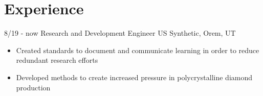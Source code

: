 \documentclass[]{friggeri-cv}
\begin{document}
\section{Experience}
\vspace{-3mm}
\begin{entrylist}

  \entry
    {8/19 - now}
    {Research and Development Engineer}
    {US Synthetic, Orem, UT}
    {\vspace{-4mm}
    \begin{itemize}
        \item Created standards to document and communicate learning in order to reduce redundant research efforts
        \item Developed methods to create increased pressure in polycrystalline diamond production
    \end{itemize}\vspace{1mm}}



\end{entrylist}
\end{document}
